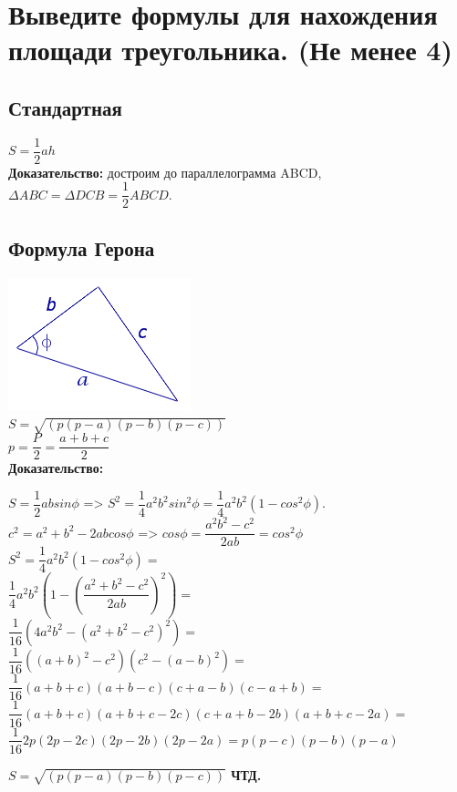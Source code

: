 \documentclass[12pt, letterpaper]{article}
\begin{document}
\section {Выведите формулы для нахождения площади треугольника. (Не менее 4)}
\subsection {Стандартная}
$S=\dfrac{1}{2}ah $ \\
\textbf{Доказательство:} достроим до параллелограмма ABCD,\\
$\Delta ABC = \Delta DCB = \dfrac{1}{2}ABCD. $ \\

\subsection {Формула Герона}
\includegraphics[scale=1]{asset.png} \\
$S=\sqrt{(p(p-a)(p-b)(p-c))}$ \\
$p=\dfrac{P}{2}=\dfrac{a+b+c}{2}$ \\
\textbf{Доказательство:} \\
\begin{flushleft}
$S=\dfrac{1}{2}absin\phi$ => $S^2=\dfrac{1}{4}a^2b^2sin^2\phi=\dfrac{1}{4}a^2b^2(1-cos^2\phi).$ \\
$c^2=a^2+b^2-2abcos\phi$ => $cos\phi=\dfrac{a^2b^2-c^2}{2ab}=cos^2\phi$\\
$S^2=\dfrac{1}{4}a^2b^2(1-cos^2\phi)= $ \\
$ \dfrac{1}{4}a^2b^2(1-(\dfrac{a^2+b^2-c^2}{2ab})^2)=$ \\
$ \dfrac{1}{16}(4a^2b^2-(a^2+b^2-c^2)^2)= $ \\
$ \dfrac{1}{16}((a+b)^2-c^2)(c^2-(a-b)^2)= $ \\
$ \dfrac{1}{16}(a+b+c)(a+b-c)(c+a-b)(c-a+b)= $ \\
$ \dfrac{1}{16}(a+b+c)(a+b+c-2c)(c+a+b-2b)(a+b+c-2a)= $ \\ 
$ \dfrac{1}{16}2p(2p-2c)(2p-2b)(2p-2a)= p(p-c)(p-b)(p-a)$ \\
\end{flushleft}
\textbf{$ S=\sqrt{(p(p-a)(p-b)(p-c))} $ ЧТД.}
\end{document}
